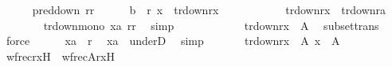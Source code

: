 \begin{isabellebody}
\isanewline
\ \ \ \ \isamarkupfalse%
\ pred{\isacharunderscore}{\kern0pt}down\ rr\isanewline
\ \ \ \ \isamarkupfalse%
\ b\ {\isacharcolon}{\kern0pt}\ {\isachardoublequoteopen}r\ {\isacharminus}{\kern0pt}{\isacharbackquote}{\kern0pt}{\isacharbackquote}{\kern0pt}{\isacharbraceleft}{\kern0pt}x{\isacharbraceright}{\kern0pt}\ {\isasymsubseteq}\ tr{\isacharunderscore}{\kern0pt}down{\isacharparenleft}{\kern0pt}r{\isacharcomma}{\kern0pt}x{\isacharparenright}{\kern0pt}{\isachardoublequoteclose}\ \isacommand{{\isachardot}{\kern0pt}}\isamarkupfalse%
\isanewline
\ \ \ \ \isamarkupfalse%
\isanewline
\ \ \ \ \isamarkupfalse%
\ {\isachardoublequoteopen}tr{\isacharunderscore}{\kern0pt}down{\isacharparenleft}{\kern0pt}r{\isacharcomma}{\kern0pt}x{\isacharparenright}{\kern0pt}\ {\isasymsubseteq}\ tr{\isacharunderscore}{\kern0pt}down{\isacharparenleft}{\kern0pt}r{\isacharcomma}{\kern0pt}a{\isacharparenright}{\kern0pt}{\isachardoublequoteclose}\isanewline
\ \ \ \ \ \ \isamarkupfalse%
\ tr{\isacharunderscore}{\kern0pt}down{\isacharunderscore}{\kern0pt}mono\ x{\isacharunderscore}{\kern0pt}a\ rr\ \isamarkupfalse%
\ simp\isanewline
\ \ \ \ \isamarkupfalse%
\ {}\isanewline
\ \ \ \ \isamarkupfalse%
\ {\isachardoublequoteopen}tr{\isacharunderscore}{\kern0pt}down{\isacharparenleft}{\kern0pt}r{\isacharcomma}{\kern0pt}x{\isacharparenright}{\kern0pt}\ {\isasymsubseteq}\ A{\isachardoublequoteclose}\ \isamarkupfalse%
\ subset{\isacharunderscore}{\kern0pt}trans\ \isamarkupfalse%
\ force\isanewline
\ \ \ \ \isamarkupfalse%
\ {\isachardoublequoteopen}{\isasymlangle}x{\isacharcomma}{\kern0pt}a{\isasymrangle}\ {\isasymin}\ r{\isachardoublequoteclose}\ \isamarkupfalse%
\ x{\isacharunderscore}{\kern0pt}a\ \ underD\ \isamarkupfalse%
\ simp\isanewline
\ \ \ \ \isamarkupfalse%
\ {}\ {\isacartoucheopen}tr{\isacharunderscore}{\kern0pt}down{\isacharparenleft}{\kern0pt}r{\isacharcomma}{\kern0pt}x{\isacharparenright}{\kern0pt}\ {\isasymsubseteq}\ A{\isacartoucheclose}\ {\isacartoucheopen}x\ {\isasymin}\ A{\isacartoucheclose}\isanewline
\ \ \ \ \isamarkupfalse%
\ {\isachardoublequoteopen}wfrec{\isacharparenleft}{\kern0pt}r{\isacharcomma}{\kern0pt}x{\isacharcomma}{\kern0pt}H{\isacharparenright}{\kern0pt}\ {\isacharequal}{\kern0pt}\ wfrec{\isacharbrackleft}{\kern0pt}A{\isacharbrackright}{\kern0pt}{\isacharparenleft}{\kern0pt}r{\isacharcomma}{\kern0pt}x{\isacharcomma}{\kern0pt}H{\isacharparenright}{\kern0pt}{\isachardoublequoteclose}\ \isamarkupfalse%

\end{isabellebody}
